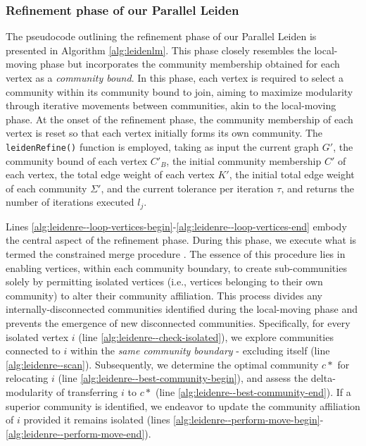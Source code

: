 \subsubsection{Refinement phase of our Parallel Leiden}

The pseudocode outlining the refinement phase of our Parallel Leiden is presented in Algorithm \ref{alg:leidenlm}. This phase closely resembles the local-moving phase but incorporates the community membership obtained for each vertex as a \textit{community bound}. In this phase, each vertex is required to select a community within its community bound to join, aiming to maximize modularity through iterative movements between communities, akin to the local-moving phase. At the onset of the refinement phase, the community membership of each vertex is reset so that each vertex initially forms its own community. The \texttt{leidenRefine()} function is employed, taking as input the current graph $G'$, the community bound of each vertex $C'_B$, the initial community membership $C'$ of each vertex, the total edge weight of each vertex $K'$, the initial total edge weight of each community $\Sigma'$, and the current tolerance per iteration $\tau$, and returns the number of iterations executed $l_j$.



Lines \ref{alg:leidenre--loop-vertices-begin}-\ref{alg:leidenre--loop-vertices-end} embody the central aspect of the refinement phase. During this phase, we execute what is termed the constrained merge procedure \cite{com-traag19}. The essence of this procedure lies in enabling vertices, within each community boundary, to create sub-communities solely by permitting isolated vertices (i.e., vertices belonging to their own community) to alter their community affiliation. This process divides any internally-disconnected communities identified during the local-moving phase and prevents the emergence of new disconnected communities. Specifically, for every isolated vertex $i$ (line \ref{alg:leidenre--check-isolated}), we explore communities connected to $i$ within the \textit{same community boundary} - excluding itself (line \ref{alg:leidenre--scan}). Subsequently, we determine the optimal community $c*$ for relocating $i$ (line \ref{alg:leidenre--best-community-begin}), and assess the delta-modularity of transferring $i$ to $c*$ (line \ref{alg:leidenre--best-community-end}). If a superior community is identified, we endeavor to update the community affiliation of $i$ provided it remains isolated (lines \ref{alg:leidenre--perform-move-begin}-\ref{alg:leidenre--perform-move-end}).


